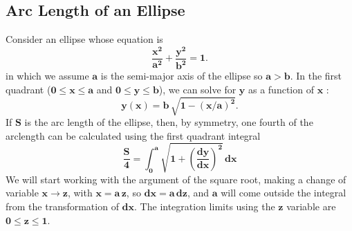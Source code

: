 \documentclass[12pt]{article}
\begin{document}
\subsection{Arc Length of an Ellipse}
Consider an ellipse whose equation is 
\begin{equation}
\mathbf{\frac{x^2}{a^2} + \frac{y^2}{b^2} = 1}.
\end{equation}
  in which we assume $\mathbf{a}$ is the semi-major axis of the ellipse so $\mathbf{a > b}$.
In the first quadrant ($\mathbf{0 \leq x \leq a}$ and $\mathbf{0 \leq y \leq b}$), we can solve
  for $\mathbf{y}$ as a function of $\mathbf{x}$ :
\begin{equation}
\mathbf{y(x) = b\,\sqrt{1 - (x/a)^2}}.
\end{equation}
If $\mathbf{S}$ is the arc length of the ellipse, then, by symmetry, one fourth of the
  arclength can be calculated using the first quadrant integral
\begin{equation}
\mathbf{\frac{S}{4} = \int_{0}^{a} \sqrt{ 1 + \left( \frac{dy}{dx} \right)^{2} } \, dx}
\end{equation}
We will start working with the argument of the square root, making a change of
  variable $\mathbf{x \rightarrow z}$, with $\mathbf{x = a\,z}$, so $\mathbf{dx = a\, dz}$,
  and $\mathbf{a}$ will come outside the integral from the transformation of $\mathbf{dx}$.
The integration limits using the $\mathbf{z}$ variable are $\mathbf{0 \leq z \leq 1}$.\\  
\end{document}
